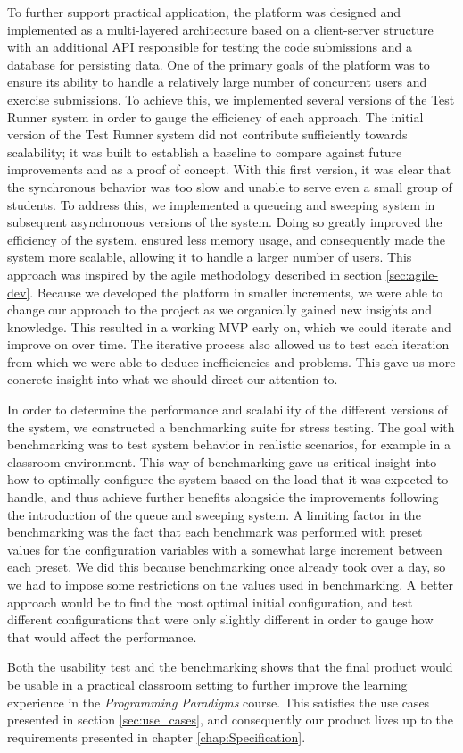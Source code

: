 To further support practical application, the platform was designed and implemented as a multi-layered architecture based on a client-server structure with an additional API responsible for testing the code submissions and a database for persisting data.
One of the primary goals of the platform was to ensure its ability to handle a relatively large number of concurrent users and exercise submissions.
To achieve this, we implemented several versions of the Test Runner system in order to gauge the efficiency of each approach.
The initial version of the Test Runner system did not contribute sufficiently towards scalability; it was built to establish a baseline to compare against future improvements and as a proof of concept.
With this first version, it was clear that the synchronous behavior was too slow and unable to serve even a small group of students.
To address this, we implemented a queueing and sweeping system in subsequent asynchronous versions of the system.
Doing so greatly improved the efficiency of the system, ensured less memory usage, and consequently made the system more scalable, allowing it to handle a larger number of users.
This approach was inspired by the agile methodology described in section \ref{sec:agile-dev}.
Because we developed the platform in smaller increments, we were able to change our approach to the project as we organically gained new insights and knowledge.
This resulted in a working MVP early on, which we could iterate and improve on over time.
The iterative process also allowed us to test each iteration from which we were able to deduce inefficiencies and problems.
This gave us more concrete insight into what we should direct our attention to.

In order to determine the performance and scalability of the different versions of the system, we constructed a benchmarking suite for stress testing.
The goal with benchmarking was to test system behavior in realistic scenarios, for example in a classroom environment.
This way of benchmarking gave us critical insight into how to optimally configure the system based on the load that it was expected to handle, and thus achieve further benefits alongside the improvements following the introduction of the queue and sweeping system.
A limiting factor in the benchmarking was the fact that each benchmark was performed with preset values for the configuration variables with a somewhat large increment between each preset.
We did this because benchmarking once already took over a day, so we had to impose some restrictions on the values used in benchmarking.
A better approach would be to find the most optimal initial configuration, and test different configurations that were only slightly different in order to gauge how that would affect the performance.

Both the usability test and the benchmarking shows that the final product would be usable in a practical classroom setting to further improve the learning experience in the \textit{Programming Paradigms} course.
This satisfies the use cases presented in section \ref{sec:use_cases}, and consequently our product lives up to the requirements presented in chapter \ref{chap:Specification}.